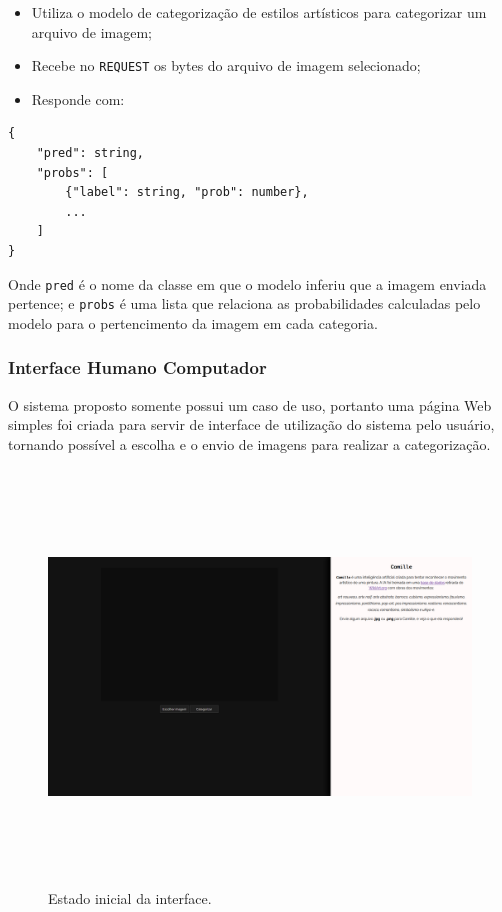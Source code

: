 \documentclass[12pt, a4paper]{article}
\begin{document}
\begin{itemize}
\item Utiliza o modelo de categorização de estilos artísticos para categorizar um arquivo de imagem;
\item Recebe no \lstinline{REQUEST} os bytes do arquivo de imagem selecionado;
\item Responde com:
\end{itemize}

\begin{lstlisting}
{
	"pred": string, 
	"probs": [
		{"label": string, "prob": number}, 
		...
	]
}
\end{lstlisting}

Onde \lstinline{pred} é o nome da classe em que o modelo inferiu que a imagem enviada pertence; e \lstinline{probs} é uma lista que relaciona as probabilidades calculadas pelo modelo para o pertencimento da imagem em cada categoria.

\subsubsection{Interface Humano Computador}
O sistema proposto somente possui um caso de uso, portanto uma página Web simples foi criada para servir de interface de utilização do sistema pelo usuário, tornando possível a escolha e o envio de imagens para realizar a categorização.

\begin{figure}[H]
	\centering
	\includegraphics[width=\textwidth, height=11cm, keepaspectratio=true]{fig/site_noimg}
	\caption{Estado inicial da interface.}
\end{figure}
\end{document}
